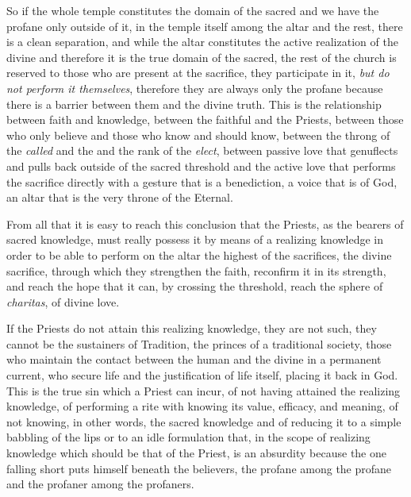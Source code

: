 So if the whole temple constitutes the domain of the sacred and we have the profane only outside of it, in the temple itself among the altar and the rest, there is a clean separation, and while the altar constitutes the active realization of the divine and therefore it is the true domain of the sacred, the rest of the church is reserved to those who are present at the sacrifice, they participate in it, \emph{but do not perform it themselves}, therefore they are always only the profane because there is a barrier between them and the divine truth. This is the relationship between faith and knowledge, between the faithful and the Priests, between those who only believe and those who know and should know, between the throng of the \emph{called} and the and the rank of the \emph{elect}, between passive love that genuflects and pulls back outside of the sacred threshold and the active love that performs the sacrifice directly with a gesture that is a benediction, a voice that is of God, an altar that is the very throne of the Eternal.

From all that it is easy to reach this conclusion that the Priests, as the bearers of sacred knowledge, must really possess it by means of a realizing knowledge in order to be able to perform on the altar the highest of the sacrifices, the divine sacrifice, through which they strengthen the faith, reconfirm it in its strength, and reach the hope that it can, by crossing the threshold, reach the sphere of
\emph{charitas}, of divine love.


If the Priests do not attain this realizing knowledge, they are not such, they cannot be the sustainers of Tradition, the princes of a traditional society, those who maintain the contact between the human and the divine in a permanent current, who secure life and the justification of life itself, placing it back in God. This is the true sin which a Priest can incur, of not having attained the realizing knowledge, of performing a rite with knowing its value, efficacy, and meaning, of not knowing, in other words, the sacred knowledge and of reducing it to a simple babbling of the lips or to an idle formulation that, in the scope of realizing knowledge which should be that of the Priest, is an absurdity because the one falling short puts himself beneath the believers, the profane among the profane and the profaner among the profaners.

